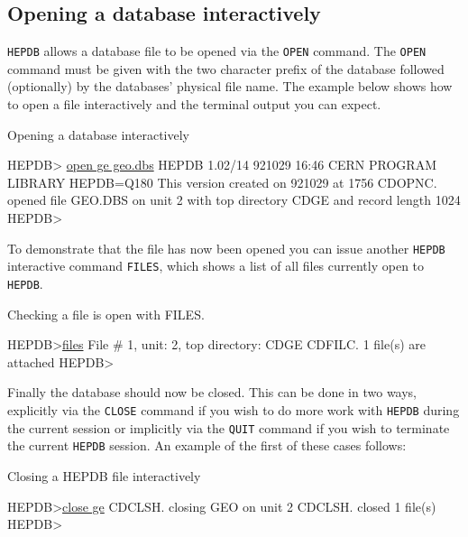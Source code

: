 \subsection {Opening a database interactively}
{\tt HEPDB} allows a database file to be opened via the {\tt OPEN} command. The
{\tt OPEN} command must be given with the two character prefix of the database followed
(optionally) by the databases' physical file name. The example below shows
how to open a file interactively and the terminal output you can
expect.
\par
\begin{XMPt}{Opening a database interactively}

HEPDB> \underline{open ge geo.dbs}
HEPDB  1.02/14 921029 16:46 CERN PROGRAM LIBRARY HEPDB=Q180
 This version created on 921029 at 1756
CDOPNC. opened file GEO.DBS on unit  2 with top directory CDGE and record length 1024
HEPDB>

\end{XMPt}
%
To demonstrate that the file has now been opened
you can issue another {\tt HEPDB} interactive command {\tt FILES}, which shows a list
of all files currently open to {\tt HEPDB}.
\par
\begin{XMPt}{Checking a file is open with FILES.}

HEPDB>\underline{files}
 File #   1, unit:  2, top directory:             CDGE
 CDFILC.           1  file(s) are attached
HEPDB>

\end{XMPt}
%
Finally the database should now be closed. This can be done in two ways, explicitly
via the {\tt CLOSE} command if you wish to do more work with {\tt HEPDB} during the
current session or implicitly via the {\tt QUIT} command if you wish to terminate the current
{\tt HEPDB} session. An example of the first of these cases follows:
\par
\begin{XMPt}{Closing a HEPDB file interactively}

HEPDB>\underline{close ge}
CDCLSH. closing GEO on unit         2
CDCLSH. closed            1  file(s)
HEPDB>

\end{XMPt}
%
%
%
